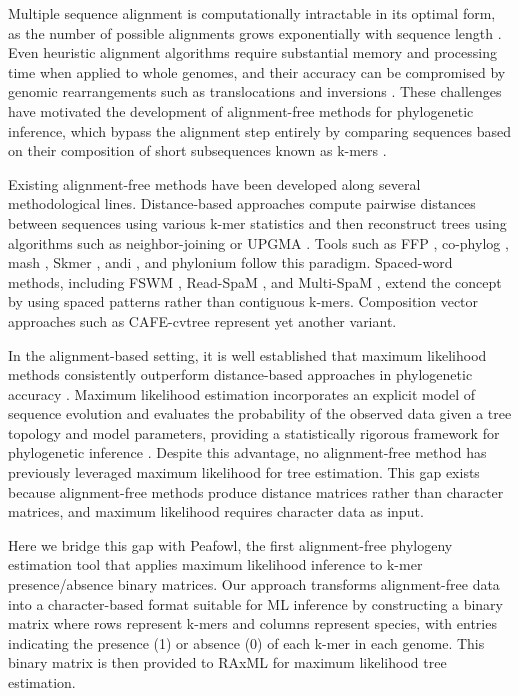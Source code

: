 \documentclass[12pt]{article}
\begin{document}
Multiple sequence alignment is computationally intractable in its optimal form, as the number of possible alignments grows exponentially with sequence length \citep{wang1994}. Even heuristic alignment algorithms require substantial memory and processing time when applied to whole genomes, and their accuracy can be compromised by genomic rearrangements such as translocations and inversions \citep{darling2004}. These challenges have motivated the development of alignment-free methods for phylogenetic inference, which bypass the alignment step entirely by comparing sequences based on their composition of short subsequences known as k-mers \citep{zielezinski2017}.

Existing alignment-free methods have been developed along several methodological lines. Distance-based approaches compute pairwise distances between sequences using various k-mer statistics and then reconstruct trees using algorithms such as neighbor-joining \citep{saitou1987} or UPGMA \citep{sokal1958}. Tools such as FFP \citep{sims2009a, sims2009b}, co-phylog \citep{yi2013}, mash \citep{ondov2016}, Skmer \citep{sarmashghi2019}, andi \citep{haubold2015}, and phylonium \citep{klotzl2020} follow this paradigm. Spaced-word methods, including FSWM \citep{leimeister2017}, Read-SpaM \citep{lau2019}, and Multi-SpaM \citep{dencker2020}, extend the concept by using spaced patterns rather than contiguous k-mers. Composition vector approaches such as CAFE-cvtree \citep{lu2013} represent yet another variant.

In the alignment-based setting, it is well established that maximum likelihood methods consistently outperform distance-based approaches in phylogenetic accuracy \citep{huelsenbeck1995, holder2003}. Maximum likelihood estimation incorporates an explicit model of sequence evolution and evaluates the probability of the observed data given a tree topology and model parameters, providing a statistically rigorous framework for phylogenetic inference \citep{felsenstein1981}. Despite this advantage, no alignment-free method has previously leveraged maximum likelihood for tree estimation. This gap exists because alignment-free methods produce distance matrices rather than character matrices, and maximum likelihood requires character data as input.

Here we bridge this gap with Peafowl, the first alignment-free phylogeny estimation tool that applies maximum likelihood inference to k-mer presence/absence binary matrices. Our approach transforms alignment-free data into a character-based format suitable for ML inference by constructing a binary matrix where rows represent k-mers and columns represent species, with entries indicating the presence (1) or absence (0) of each k-mer in each genome. This binary matrix is then provided to RAxML \citep{stamatakis2014} for maximum likelihood tree estimation.
\end{document}
